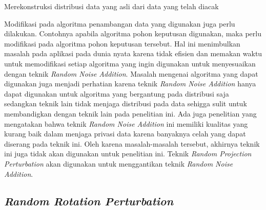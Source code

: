 \begin{algorithm}
	\DontPrintSemicolon\SetAlgoNoLine\LinesNumbered
	
	\setcounter{AlgoLine}{0}

	\caption{Merekonstruksi distribusi data yang asli dari data yang telah diacak}
	\label{alg:rekonstruksi}
\end{algorithm}

Modifikasi pada algoritma penambangan data yang digunakan juga perlu dilakukan. Contohnya apabila algoritma pohon keputusan digunakan, maka perlu modifikasi pada algoritma pohon keputusan tersebut. Hal ini menimbulkan masalah pada aplikasi pada dunia nyata karena tidak efisien dan memakan waktu untuk memodifikasi setiap algoritma yang ingin digunakan untuk menyesuaikan dengan teknik \textit{Random Noise Addition}. Masalah mengenai algoritma yang dapat digunakan juga menjadi perhatian karena teknik \textit{Random Noise Addition} hanya dapat digunakan untuk algoritma yang bergantung pada distribusi saja sedangkan teknik lain tidak menjaga distribusi pada data sehigga sulit untuk membandigkan dengan teknik lain pada penelitian ini. Ada juga penelitian yang mengatakan bahwa teknik \textit{Random Noise Addition} ini memiliki kualitas yang kurang baik dalam menjaga privasi data karena banyaknya celah yang dapat diserang pada teknik ini. Oleh karena masalah-masalah tersebut, akhirnya teknik ini juga tidak akan digunakan untuk penelitian ini. Teknik \textit{Random Projection Perturbation} akan digunakan untuk menggantikan teknik \textit{Random Noise Addition}.

\subsection{\textit{Random Rotation Perturbation}}
\label{subsec:rrp}

